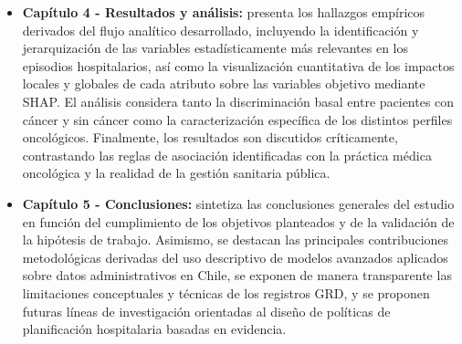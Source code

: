 \begin{itemize}
\item \textbf{Capítulo 4 - Resultados y análisis:} presenta los hallazgos empíricos derivados del flujo analítico desarrollado, incluyendo la identificación y jerarquización de las variables estadísticamente más relevantes en los episodios hospitalarios, así como la visualización cuantitativa de los impactos locales y globales de cada atributo sobre las variables objetivo mediante SHAP. El análisis considera tanto la discriminación basal entre pacientes con cáncer y sin cáncer como la caracterización específica de los distintos perfiles oncológicos. Finalmente, los resultados son discutidos críticamente, contrastando las reglas de asociación identificadas con la práctica médica oncológica y la realidad de la gestión sanitaria pública.

\item \textbf{Capítulo 5 - Conclusiones:} sintetiza las conclusiones generales del estudio en función del cumplimiento de los objetivos planteados y de la validación de la hipótesis de trabajo. Asimismo, se destacan las principales contribuciones metodológicas derivadas del uso descriptivo de modelos avanzados aplicados sobre datos administrativos en Chile, se exponen de manera transparente las limitaciones conceptuales y técnicas de los registros GRD, y se proponen futuras líneas de investigación orientadas al diseño de políticas de planificación hospitalaria basadas en evidencia.

\end{itemize}